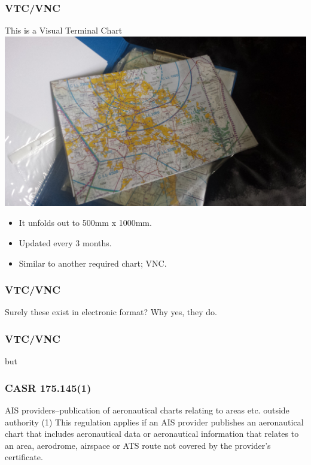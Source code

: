\begin{frame}
\frametitle{VTC/VNC}
\begin{block}{This is a Visual Terminal Chart}
\includegraphics[height=0.3\textheight,natwidth=1238,natheight=696]{image/vtc.png}
\begin{itemize}
\item<1-> It unfolds out to 500mm x 1000mm.
\item<2-> Updated every 3 months.
\item<3-> Similar to another required chart; VNC.
\end{itemize}
\end{block}
\end{frame}

\begin{frame}
\frametitle{VTC/VNC}
\begin{block}{Surely these exist in electronic format?}
Why yes, they do.
\end{block}
\end{frame}

\begin{frame}
\frametitle{VTC/VNC}
\large
\begin{center}
but
\end{center}
\end{frame}

\begin{frame}
\frametitle{CASR 175.145(1)}
\begin{block}{AIS providers--publication of aeronautical charts relating to areas etc. outside authority}
(1) This regulation applies if an AIS provider publishes an aeronautical chart that includes aeronautical data or aeronautical information that relates to an area, aerodrome, airspace or ATS route not covered by the provider's certificate.
\end{block}
\end{frame}

